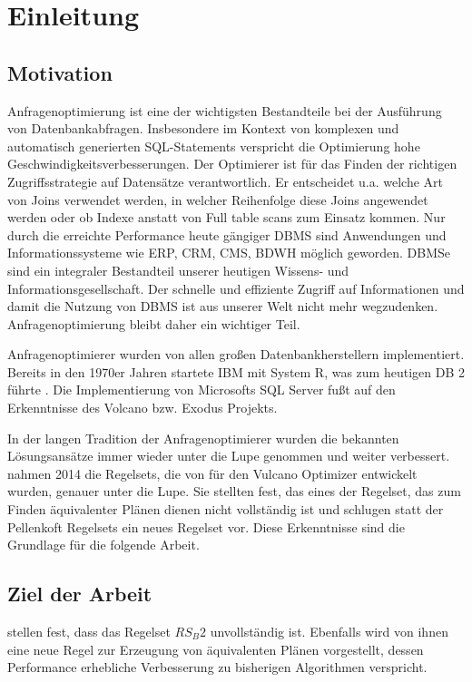 \chapter{Einleitung}

\section{Motivation}
Anfragenoptimierung ist eine der wichtigsten Bestandteile bei der Ausführung von Datenbankabfragen. Insbesondere im Kontext von komplexen und automatisch generierten SQL-Statements verspricht die Optimierung hohe Geschwindigkeitsverbesserungen. Der Optimierer ist für das Finden der richtigen Zugriffsstrategie auf Datensätze verantwortlich. Er entscheidet u.a. welche Art von Joins verwendet werden, in welcher Reihenfolge diese Joins angewendet werden oder ob Indexe anstatt von Full table scans zum Einsatz kommen. Nur durch die erreichte Performance heute gängiger \ac{DBMS} sind Anwendungen und Informationssysteme wie \ac{ERP}, \ac{CRM}, \ac{CMS}, \ac{BDWH} möglich geworden. \ac{DBMS}e sind ein integraler Bestandteil unserer heutigen Wissens- und Informationsgesellschaft. Der schnelle und effiziente Zugriff auf Informationen und damit die Nutzung von \ac{DBMS} ist aus unserer Welt nicht mehr wegzudenken. Anfragenoptimierung bleibt daher ein wichtiger Teil.


Anfragenoptimierer wurden von allen großen Datenbankherstellern implementiert. Bereits in den 1970er Jahren startete IBM mit System R, was zum heutigen DB 2 führte \cite{wade2012ibm}. Die Implementierung von Microsofts SQL Server fußt auf den Erkenntnisse des Volcano bzw. Exodus Projekts.

In der langen Tradition der Anfragenoptimierer wurden die bekannten Lösungsansätze immer wieder unter die Lupe genommen und weiter verbessert.  \cite{shanbhag2014optimizing} nahmen 2014 die Regelsets, die von \cite{pellenkoft1997complexity} für den Vulcano Optimizer entwickelt wurden, genauer unter die Lupe. Sie stellten fest, das eines der Regelset, das zum Finden äquivalenter Plänen dienen nicht vollständig ist und schlugen statt der Pellenkoft Regelsets ein neues Regelset vor. Diese Erkenntnisse sind die Grundlage für die folgende Arbeit.

\section{Ziel der Arbeit}

\cite{shanbhag2014optimizing} stellen fest, dass das Regelset $RS_B2$ unvollständig ist. Ebenfalls wird von ihnen eine neue Regel zur Erzeugung von äquivalenten Plänen vorgestellt, dessen Performance erhebliche Verbesserung zu bisherigen Algorithmen verspricht.

